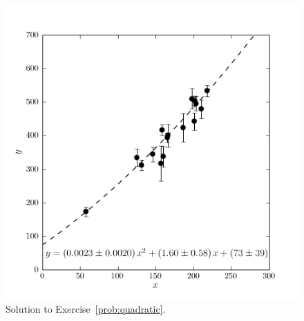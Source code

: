 \documentclass[12pt,twoside]{article}
\newcommand{\problemname}{Exercise}
\newcounter{problem}
\begin{document}
\clearpage
\begin{figure}[H]
\includegraphics[]{ex3.png}
\caption{Solution to \problemname~\ref{prob:quadratic}.}\label{fig:quadratic}
\end{figure}
\end{document}

